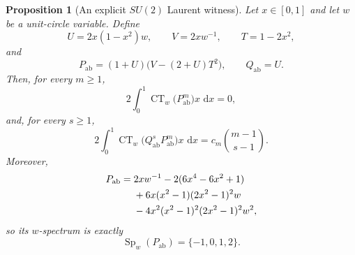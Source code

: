 \documentclass[11pt]{article}
\numberwithin{equation}{section}
\newtheorem{proposition}[theorem]{Proposition}
\newcommand{\CT}{\operatorname{CT}}
\newcommand{\dd}{\,\mathrm d}
\begin{document}
\begin{proposition}[An explicit $SU(2)$ Laurent witness]
\label{prop:explicit-abelian-SU2}
Let $x\in[0,1]$ and let $w$ be a unit-circle variable.  Define
\[
 U=2x(1-x^2)w,
 \qquad
 V=2xw^{-1},
 \qquad
 T=1-2x^2,
\]
and
\begin{equation}\label{eq:explicit-abelian-pair}
 P_{\mathrm{ab}}=(1+U)\bigl(V-(2+U)T^2\bigr),
 \qquad
 Q_{\mathrm{ab}}=U.
\end{equation}
Then, for every $m\geq1$,
\begin{equation}\label{eq:explicit-abelian-pure}
 2\int_0^1 \CT_w\!\bigl(P_{\mathrm{ab}}^m\bigr)x\,\dd x=0,
\end{equation}
and, for every $s\geq1$,
\begin{equation}\label{eq:explicit-abelian-marker}
 2\int_0^1 \CT_w\!\bigl(Q_{\mathrm{ab}}^sP_{\mathrm{ab}}^m\bigr)x\,\dd x
 =c_m\binom{m-1}{s-1}.
\end{equation}
Moreover,
\begin{align}
 P_{\mathrm{ab}}
 ={}&2xw^{-1}-2(6x^4-6x^2+1)\notag\\
 &+6x(x^2-1)(2x^2-1)^2w\notag\\
 &-4x^2(x^2-1)^2(2x^2-1)^2w^2,
 \label{eq:explicit-abelian-expansion}
\end{align}
so its $w$-spectrum is exactly
\begin{equation}\label{eq:explicit-abelian-spectrum}
 \operatorname{Sp}_w(P_{\mathrm{ab}})=\{-1,0,1,2\}.
\end{equation}
\end{proposition}
\end{document}
